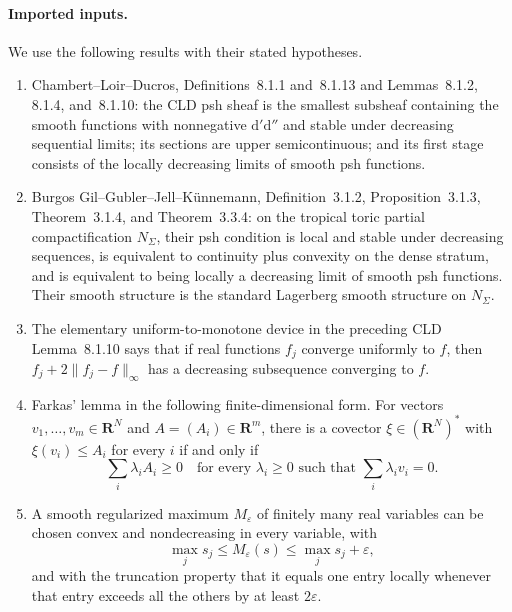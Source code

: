 
\paragraph{Imported inputs.}
We use the following results with their stated hypotheses.
\begin{enumerate}
\item Chambert--Loir--Ducros, Definitions~8.1.1 and~8.1.13 and
Lemmas~8.1.2, 8.1.4, and~8.1.10: the CLD psh sheaf is the smallest
subsheaf containing the smooth functions with nonnegative
$\mathrm d'\mathrm d''$ and stable under decreasing sequential limits; its
sections are upper semicontinuous; and its first stage consists of the
locally decreasing limits of smooth psh functions.
\item Burgos Gil--Gubler--Jell--K\"unnemann, Definition~3.1.2,
Proposition~3.1.3, Theorem~3.1.4, and Theorem~3.3.4: on the tropical toric
partial compactification $N_\Sigma$, their psh condition is local and stable
under decreasing sequences, is equivalent to continuity plus convexity on
the dense stratum, and is equivalent to being locally a decreasing limit of
smooth psh functions.  Their smooth structure is the standard Lagerberg
smooth structure on $N_\Sigma$.
\item The elementary uniform-to-monotone device in the preceding CLD
Lemma~8.1.10 says that if real functions $f_j$ converge uniformly to $f$,
then $f_j+2\lVert f_j-f\rVert_\infty$ has a decreasing subsequence
converging to $f$.
\item Farkas' lemma in the following finite-dimensional form.  For vectors
$v_1,\ldots,v_m\in\mathbf R^N$ and $A=(A_i)\in\mathbf R^m$, there is a
covector $\xi\in(\mathbf R^N)^*$ with $\xi(v_i)\leq A_i$ for every $i$ if
and only if
\[
 \sum_i\lambda_iA_i\geq0
 \quad\text{for every }\lambda_i\geq0
 \text{ such that }\sum_i\lambda_i v_i=0.
\]
\item A smooth regularized maximum $M_\varepsilon$ of finitely many real
variables can be chosen convex and nondecreasing in every variable, with
\[
 \max_j s_j\leq M_\varepsilon(s)\leq\max_j s_j+\varepsilon,
\]
and with the truncation property that it equals one entry locally whenever
that entry exceeds all the others by at least $2\varepsilon$.
\end{enumerate}

